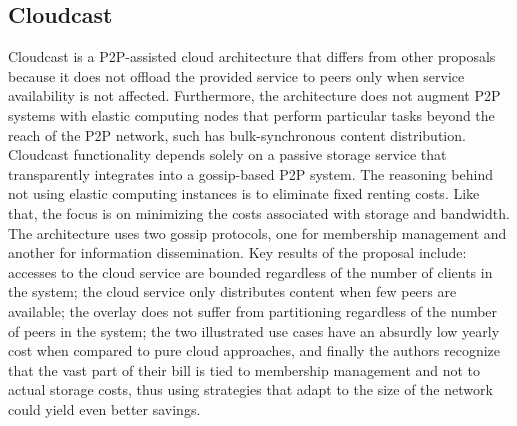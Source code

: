 \documentclass[runningheads]{llncs}
\begin{document}
\subsection{Cloudcast}
Cloudcast \cite{cloudcast} is a P2P-assisted cloud architecture that differs from other proposals because it does not offload the provided service to peers only when service availability is not affected. Furthermore, the architecture does not augment P2P systems with elastic computing nodes that perform particular tasks beyond the reach of the P2P network, such has bulk-synchronous content distribution. Cloudcast functionality depends solely on a passive storage service that transparently integrates into a gossip-based P2P system. The reasoning behind not using elastic computing instances is to eliminate fixed renting costs. Like that, the focus is on minimizing the costs associated with storage and bandwidth. The architecture uses two gossip protocols, one for membership management and another for information dissemination. Key results of the proposal include: accesses to the cloud service are bounded regardless of the number of clients in the system; the cloud service only distributes content when few peers are available; the overlay does not suffer from partitioning regardless of the number of peers in the system; the two illustrated use cases have an absurdly low yearly cost when compared to pure cloud approaches, and finally the authors recognize that the vast part of their bill is tied to membership management and not to actual storage costs, thus using strategies that adapt to the size of the network could yield even better savings.
\end{document}
